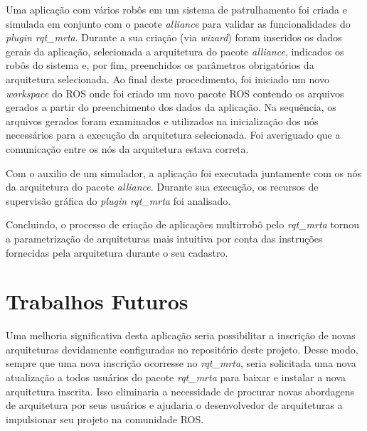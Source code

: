         Uma aplicação com vários robôs em um sistema de patrulhamento foi criada e simulada em conjunto com o pacote \textit{alliance} para validar as funcionalidades do \textit{plugin rqt\_mrta}. Durante a sua criação (via \textit{wizard}) foram inseridos os dados gerais da aplicação, selecionada a arquitetura do pacote \textit{alliance}, indicados os robôs do sistema e, por fim, preenchidos os parâmetros obrigatórios da arquitetura selecionada. Ao final deste procedimento, foi iniciado um novo \textit{workspace} do ROS onde foi criado um novo pacote ROS contendo os arquivos gerados a partir do preenchimento dos dados da aplicação. Na sequência, os arquivos gerados foram examinados e utilizados na inicialização dos nós necessários para a execução da arquitetura selecionada. Foi averiguado que a comunicação entre os nós da arquitetura estava correta.
        
        Com o auxilio de um simulador, a aplicação foi executada juntamente com os nós da arquitetura do pacote \textit{alliance}. Durante sua execução, os recursos de supervisão gráfica do \textit{plugin rqt\_mrta} foi analisado.
        
        Concluindo, o processo de criação de aplicações multirrobô pelo \textit{rqt\_mrta} tornou a parametrização de arquiteturas mais intuitiva por conta das instruções fornecidas pela arquitetura durante o seu cadastro.
        
        
    \section{Trabalhos Futuros}
        Uma melhoria significativa desta aplicação seria possibilitar a inscrição de novas arquiteturas devidamente configuradas no repositório deste projeto. Desse modo, sempre que uma nova inscrição ocorresse no \textit{rqt\_mrta}, seria solicitada uma nova atualização a todos usuários do pacote \textit{rqt\_mrta} para baixar e instalar a nova arquitetura inscrita. Isso eliminaria a necessidade de procurar novas abordagens de arquitetura por seus usuários e ajudaria o desenvolvedor de arquiteturas a impulsionar seu projeto na comunidade ROS.
        
